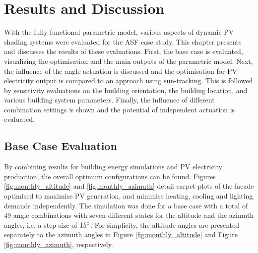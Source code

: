 \chapter{Results and Discussion}
\label{ch:results}

With the fully functional parametric model, various aspects of dynamic PV shading systems were evaluated for the ASF case study. This chapter presents and discusses the results of these evaluations. First, the base case is evaluated, visualizing the optimisation and the main outputs of the parametric model. Next, the influence of the angle actuation is discussed and the optimisation for PV electricity output is compared to an approach using sun-tracking. This is followed by sensitivity evaluations on the building orientation, the building location, and various building system parameters. Finally, the influence of different combination settings is shown and the potential of independent actuation is evaluated. 


\section{Base Case Evaluation}
\label{s:baseCase}
	By combining results for building energy simulations and PV electricity production, the overall optimum configurations can be found. Figures \ref{fig:monthly_altitude} and \ref{fig:monthly_azimuth} detail carpet-plots of the facade optimised to maximise PV generation, and minimise heating, cooling and lighting demands independently. The simulation was done for a base case with a total of 49 angle combinations with seven different states for the altitude and the azimuth angles, i.e. a step size of $15\degree$. For simplicity, the altitude angles are presented separately to the azimuth angles in Figure \ref{fig:monthly_altitude} and Figure \ref{fig:monthly_azimuth}, respectively.  %

